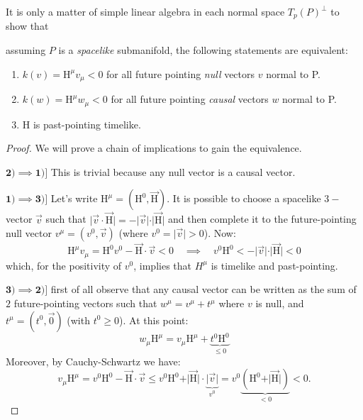 It is only a matter of simple linear algebra in each normal space \(T_p(P)^{\perp}\) to show that
\begin{lemma} \label{lemma:charact-trapped}
	assuming \(P\) is a \emph{spacelike} submanifold, the following statements are equivalent:
	\begin{enumerate}
		\item  \(k(v) =\mathrm{H}^{\mu} v_{\mu} < 0 \) for all future pointing \emph{null} vectors \(v\) normal to P.
		\item  \(k(w) =\mathrm{H}^{\mu} w_{\mu} < 0 \) for all future pointing \emph{causal} vectors \(w\) normal to P.
		\item \(\mathrm{H}\) is past-pointing timelike.
	\end{enumerate}
\end{lemma}

\begin{proof}
	We will prove a chain of implications to gain the equivalence.
	
	\(\mathbf{2) \implies 1)]}\) This is trivial because any null vector is a causal vector.
	
	\(\mathbf{1) \implies 3)]}\) Let's write \(\mathrm{H}^{\mu} = (\mathrm{H}^0, \vec{\mathrm{H}})\). It is possible to choose a spacelike \(3-\)vector \(\vec{v}\) such that \(\vert\vec{v}\cdot\vec{\mathrm{H}}\vert = - \vert\vec{v}\vert\cdot\vert\vec{\mathrm{H}}\vert\) and  then complete it to the future-pointing null vector \(v^{\mu} = (v^0, \vec{v})\) (where \(v^0 = \vert \vec{v}\vert > 0\)).
	Now:
	\[
	\mathrm{H}^{\mu}v_{\mu} = \mathrm{H}^0v^0 - \vec{\mathrm{H}}\cdot\vec{v} < 0 \quad \implies 
	\quad v^0 \mathrm{H}^0 < - \vert\vec{v}\vert\cdot\vert\vec{\mathrm{H}}\vert < 0
	\]
	which, for the positivity of \(v^0\), implies that \(H^{\mu}\) is timelike and past-pointing.
	
	\(\mathbf{3) \implies 2)]}\) first of all observe that any causal vector can be written as the sum of \(2\) future-pointing vectors such that \(w^{\mu}= v^{\mu} + t^{\mu}\) where \(v\) is null, and \(t^{\mu} = (t^0, \vec{0})\) (with \(t^0 \ge 0\)). At this point:
	\[
	w_{\mu}\mathrm{H}^{\mu} = v_{\mu}\mathrm{H}^{\mu} + \underbrace{t^0 \mathrm{H}^0}_{\le0}
	\]
	Moreover, by Cauchy-Schwartz we have:
	\[
	v_{\mu}\mathrm{H}^{\mu} = v^0 \mathrm{H}^0 - \vec{\mathrm{H}}\cdot\vec{v} \le v^0\mathrm{H}^0 +\vert \vec{\mathrm{H}}\vert\cdot\underbrace{\vert\vec{v}\vert}_{v^0} = v^0\underbrace{(\mathrm{H}^0 + \vert \vec{\mathrm{H}}\vert)}_{<0} < 0.
	\]
\end{proof}

